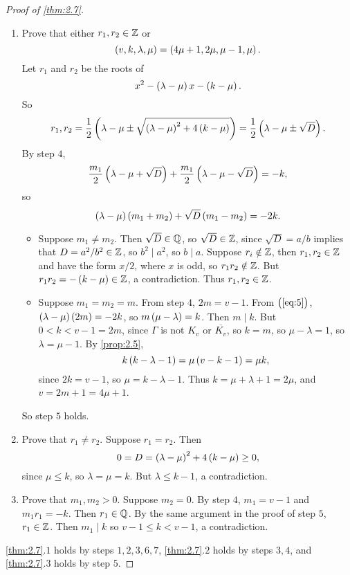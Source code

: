 \begin{proof}[Proof of \ref{thm:2.7}]
\begin{enumerate}[leftmargin=0.5in, label=Step \arabic*.]
\item Prove that either $ r_1, r_2 \in \mathbb{Z} $ or
$$ \br{v, k, \lambda, \mu} = \br{4\mu + 1, 2\mu, \mu - 1, \mu}. $$
Let $ r_1 $ and $ r_2 $ be the roots of
$$ x^2 - \br{\lambda - \mu}x - \br{k - \mu}. $$
So
$$ r_1, r_2 = \dfrac{1}{2}\br{\lambda - \mu \pm \sqrt{\br{\lambda - \mu}^2 + 4\br{k - \mu}}} = \dfrac{1}{2}\br{\lambda - \mu \pm \sqrt{D}}. $$
By step $ 4 $,
$$ \dfrac{m_1}{2}\br{\lambda - \mu + \sqrt{D}} + \dfrac{m_1}{2}\br{\lambda - \mu - \sqrt{D}} = -k, $$
so
\begin{equation}
\label{eq:5}
\br{\lambda - \mu}\br{m_1 + m_2} + \sqrt{D}\br{m_1 - m_2} = -2k.
\end{equation}
\begin{itemize}
\item Suppose $ m_1 \ne m_2 $. Then $ \sqrt{D} \in \mathbb{Q} $, so $ \sqrt{D} \in \mathbb{Z} $, since $ \sqrt{D} = a / b $ implies that $ D = a^2 / b^2 \in \mathbb{Z} $, so $ b^2 \mid a^2 $, so $ b \mid a $. Suppose $ r_i \notin \mathbb{Z} $, then $ r_1, r_2 \in \mathbb{Z} $ and have the form $ x / 2 $, where $ x $ is odd, so $ r_1r_2 \notin \mathbb{Z} $. But $ r_1r_2 = -\br{k - \mu} \in \Z $, a contradiction. Thus $ r_1, r_2 \in \mathbb{Z} $.
\item Suppose $ m_1 = m_2 = m $. From step $ 4 $, $ 2m = v - 1 $. From $ \br{\ref{eq:5}} $, $ \br{\lambda - \mu}\br{2m} = -2k $, so $ m\br{\mu - \lambda} = k $. Then $ m \mid k $. But $ 0 < k < v - 1 = 2m $, since $ \Gamma $ is not $ K_v $ or $ \overline{K_v} $, so $ k = m $, so $ \mu - \lambda = 1 $, so $ \lambda = \mu - 1 $. By \ref{prop:2.5},
$$ k\br{k - \lambda - 1} = \mu\br{v - k - 1} = \mu k, $$
since $ 2k = v - 1 $, so $ \mu = k - \lambda - 1 $. Thus $ k = \mu + \lambda + 1 = 2\mu $, and $ v = 2m + 1 = 4\mu + 1 $.
\end{itemize}
So step $ 5 $ holds.
\item Prove that $ r_1 \ne r_2 $. Suppose $ r_1 = r_2 $. Then
$$ 0 = D = \br{\lambda - \mu}^2 + 4\br{k - \mu} \ge 0, $$
since $ \mu \le k $, so $ \lambda = \mu = k $. But $ \lambda \le k - 1 $, a contradiction.
\item Prove that $ m_1, m_2 > 0 $. Suppose $ m_2 = 0 $. By step $ 4 $, $ m_1 = v - 1 $ and $ m_1r_1 = -k $. Then $ r_1 \in \mathbb{Q} $. By the same argument in the proof of step $ 5 $, $ r_1 \in \mathbb{Z} $. Then $ m_1 \mid k $ so $ v - 1 \le k < v - 1 $, a contradiction.
\end{enumerate}
\ref{thm:2.7}.$ 1 $ holds by steps $ 1, 2, 3, 6, 7 $, \ref{thm:2.7}.$ 2 $ holds by steps $ 3, 4 $, and \ref{thm:2.7}.$ 3 $ holds by step $ 5 $.
\end{proof}

